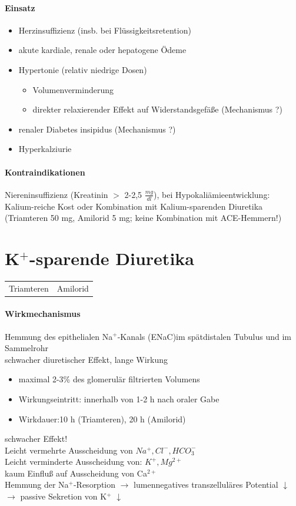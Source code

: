 \documentclass[10pt,a4paper]{report}
\begin{document}
\paragraph{Einsatz}
\begin{itemize}
	\item Herzinsuffizienz (insb. bei Flüssigkeitsretention)
	\item akute kardiale, renale oder hepatogene Ödeme
	\item Hypertonie (relativ niedrige Dosen)
	\begin{itemize}
		\item Volumenverminderung
		\item direkter relaxierender Effekt auf Widerstandsgefäße (Mechanismus ?)
	\end{itemize}		
	\item renaler Diabetes insipidus (Mechanismus ?)
	\item Hyperkalziurie
\end{itemize}
\paragraph{Kontraindikationen}Niereninsuffizienz (Kreatinin $>$ 2-2,5 $\frac{mg}{dl}$), bei Hypokaliämieentwicklung: Kalium-reiche Kost oder Kombination mit Kalium-sparenden Diuretika (Triamteren 50 mg, Amilorid 5 mg; keine Kombination mit ACE-Hemmern!)
\section{K$^+$-sparende Diuretika}
\begin{tabularx}{\textwidth}{XX}
Triamteren&Amilorid\\
\end{tabularx}
\paragraph{Wirkmechanismus}
Hemmung des epithelialen Na$^+$-Kanals (ENaC)im spätdistalen Tubulus und im Sammelrohr\\
schwacher diuretischer Effekt, lange Wirkung
\begin{itemize}
	\item maximal 2-3\% des glomerulär filtrierten Volumens
	\item Wirkungseintritt: innerhalb von 1-2 h nach oraler Gabe
	\item Wirkdauer:10 h (Triamteren), 20 h (Amilorid)
\end{itemize}
schwacher Effekt!
\\
Leicht vermehrte Ausscheidung von $Na^+, Cl^-, HCO_3^-$\\ 
Leicht verminderte Ausscheidung von: $K^+, Mg^{2+}$\\
kaum Einfluß auf Ausscheidung von Ca$^{2+}$\\
Hemmung der Na$^+$-Resorption $\rightarrow$ lumennegatives transzelluläres Potential $\downarrow$ $\rightarrow$ passive Sekretion von K$^+$ $\downarrow$
\end{document}
